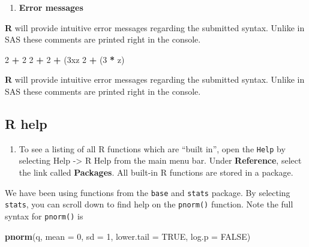 \documentclass[]{book}
\newenvironment{Shaded}{\begin{snugshade}}{\end{snugshade}}
\newcommand{\KeywordTok}[1]{\textcolor[rgb]{0.13,0.29,0.53}{\textbf{#1}}}
\newcommand{\DataTypeTok}[1]{\textcolor[rgb]{0.13,0.29,0.53}{#1}}
\newcommand{\DecValTok}[1]{\textcolor[rgb]{0.00,0.00,0.81}{#1}}
\newcommand{\StringTok}[1]{\textcolor[rgb]{0.31,0.60,0.02}{#1}}
\newcommand{\OtherTok}[1]{\textcolor[rgb]{0.56,0.35,0.01}{#1}}
\newcommand{\OperatorTok}[1]{\textcolor[rgb]{0.81,0.36,0.00}{\textbf{#1}}}
\newcommand{\NormalTok}[1]{#1}
\providecommand{\tightlist}{%
  \setlength{\itemsep}{0pt}\setlength{\parskip}{0pt}}
\begin{document}
\begin{enumerate}
\def\labelenumi{\arabic{enumi}.}
\setcounter{enumi}{2}
\tightlist
\item
  \textbf{Error messages}
\end{enumerate}

\textbf{R} will provide intuitive error messages regarding the submitted
syntax. Unlike in SAS these comments are printed right in the console.

\begin{Shaded}
\begin{Highlighting}[]
\DecValTok{2} \OperatorTok{+}\StringTok{ }\DecValTok{2}
\DecValTok{2} \OperatorTok{+}
\DecValTok{2} \OperatorTok{+}\StringTok{ }\NormalTok{(3xz}
\DecValTok{2} \OperatorTok{+}\StringTok{ }\NormalTok{(}\DecValTok{3} \OperatorTok{*}\StringTok{ }\NormalTok{z)}
\end{Highlighting}
\end{Shaded}

\textbf{R} will provide intuitive error messages regarding the submitted
syntax. Unlike in SAS these comments are printed right in the console.

\subsection{R help}\label{r-help}

\begin{enumerate}
\def\labelenumi{\arabic{enumi}.}
\tightlist
\item
  To see a listing of all R functions which are ``built in'', open the
  \texttt{Help} by selecting Help -\textgreater{} R Help from the main
  menu bar. Under \textbf{Reference}, select the link called
  \textbf{Packages}. All built-in R functions are stored in a package.
\end{enumerate}

We have been using functions from the \texttt{base} and \texttt{stats}
package. By selecting \texttt{stats}, you can scroll down to find help
on the \texttt{pnorm()} function. Note the full syntax for
\texttt{pnorm()} is

\begin{Shaded}
\begin{Highlighting}[]
\KeywordTok{pnorm}\NormalTok{(q, }\DataTypeTok{mean =} \DecValTok{0}\NormalTok{, }\DataTypeTok{sd =} \DecValTok{1}\NormalTok{, }\DataTypeTok{lower.tail =} \OtherTok{TRUE}\NormalTok{, }\DataTypeTok{log.p =} \OtherTok{FALSE}\NormalTok{)}
\end{Highlighting}
\end{Shaded}
\end{document}
